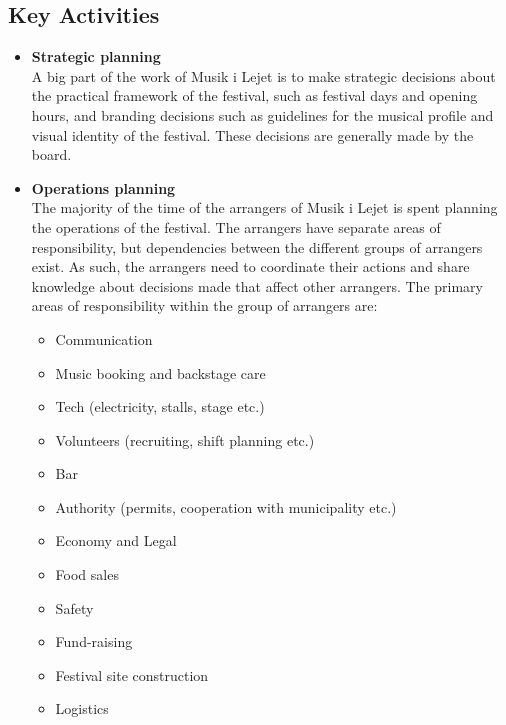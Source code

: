 \subsection{Key Activities} %
\label{sub:key_activities}
\begin{itemize}
(baseret på organisations diagram)
	\item \textbf{Strategic planning}\\
	A big part of the work of Musik i Lejet is to make strategic decisions about the practical framework of the festival, such as festival days and opening hours, and branding decisions such as guidelines for the musical profile and visual identity of the festival. These decisions are generally made by the board.
	\item \textbf{Operations planning}\\
	The majority of the time of the arrangers of Musik i Lejet is spent planning the operations of the festival. The arrangers have separate areas of responsibility, but dependencies between the different groups of arrangers exist. As such, the arrangers need to coordinate their actions and share knowledge about decisions made that affect other arrangers. The primary areas of responsibility within the group of arrangers are:
	\begin{itemize}
		\item Communication
		\item Music booking and backstage care
		\item Tech (electricity, stalls, stage etc.)
		\item Volunteers (recruiting, shift planning etc.)
		\item Bar
		\item Authority (permits, cooperation with municipality etc.)
		\item Economy and Legal
		\item Food sales
		\item Safety
		\item Fund-raising
		\item Festival site construction
		\item Logistics
	\end{itemize}
\end{itemize}

